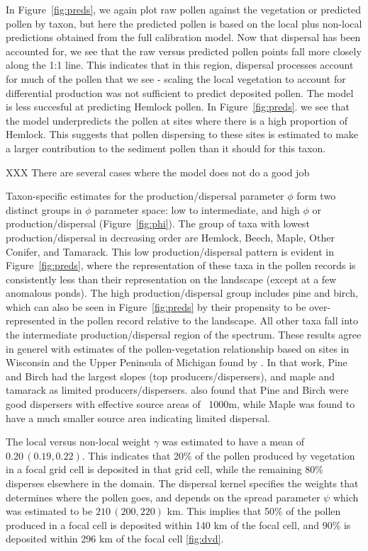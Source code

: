 \documentclass[12pt]{article}
\begin{document}
In Figure~\ref{fig:preds}, we again plot raw pollen against the
vegetation or predicted pollen by taxon, but here the predicted pollen
is based on the local plus non-local predictions obtained from the
full calibration model. Now that dispersal has been accounted for, we
see that the raw versus predicted pollen points fall more closely
along the 1:1 line. This indicates that in this region, dispersal
processes account for much of the pollen that we see - scaling the
local vegetation to account for differential production was not
sufficient to predict deposited pollen. The model is less succesful at
predicting Hemlock pollen. In Figure~\ref{fig:preds}. we see that the
model underpredicts the pollen at sites where there is a high
proportion of Hemlock. This suggests that pollen dispersing to these
sites is estimated to make a larger contribution to the sediment
pollen than it should for this taxon.

XXX There are several cases where the model does not do a good job   

Taxon-specific estimates for the production/dispersal parameter $\phi$
form two distinct groups in $\phi$ parameter space: low to
intermediate, and high $\phi$ or production/dispersal
(Figure~\ref{fig:phi}). The group of taxa with lowest
production/dispersal in decreasing order are Hemlock, Beech, Maple,
Other Conifer, and Tamarack. This low production/dispersal pattern is
evident in Figure~\ref{fig:preds}, where the representation of these
taxa in the pollen records is consistently less than their
representation on the landscape (except at a few anomalous ponds). The
high production/dispersal group includes pine and birch, which can
also be seen in Figure~\ref{fig:preds} by their propensity to be
over-represented in the pollen record relative to the landscape. All
other taxa fall into the intermediate production/dispersal region of
the spectrum. These results agree in generel with estimates of the
pollen-vegetation relationship based on sites in Wisconsin and the
Upper Peninsula of Michigan found by \cite{prentice1986}. In that
work, Pine and Birch had the largest slopes (top
producers/dispersers), and maple and tamarack as limited
producers/dispersers. \cite{jackson1990} also found that Pine and
Birch were good dispersers with effective source areas of ~1000m,
while Maple was found to have a much smaller source area indicating
limited dispersal.

The local versus non-local weight $\gamma$ was estimated to have a
mean of $0.20\,(0.19, 0.22)$. This indicates that 20\% of the pollen
produced by vegetation in a focal grid cell is deposited in that grid
cell, while the remaining 80\% disperses elsewhere in the domain. The
dispersal kernel specifies the weights that determines where the
pollen goes, and depends on the spread parameter $\psi$ which was
estimated to be $210\,(200, 220)$ km. This implies that 50\% of the
pollen produced in a focal cell is deposited within 140 km of the
focal cell, and 90\% is deposited within 296 km of the focal cell \ref{fig:dvd}.
\end{document}
